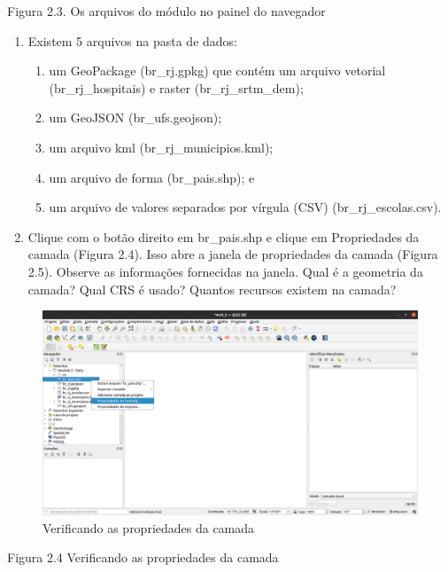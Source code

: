 \documentclass[
  portuguese,
]{krantz}
\providecommand{\tightlist}{%
  \setlength{\itemsep}{0pt}\setlength{\parskip}{0pt}}
\begin{document}
Figura 2.3. Os arquivos do módulo no painel do navegador

\begin{enumerate}
\def\labelenumi{\arabic{enumi}.}
\setcounter{enumi}{5}
\item
  Existem 5 arquivos na pasta de dados:

  \begin{enumerate}
  \def\labelenumii{\arabic{enumii}.}
  \tightlist
  \item
    um GeoPackage (br\_rj.gpkg) que contém um arquivo vetorial (br\_rj\_hospitais) e raster (br\_rj\_srtm\_dem);
  \item
    um GeoJSON (br\_ufs.geojson);
  \item
    um arquivo kml (br\_rj\_municipios.kml);
  \item
    um arquivo de forma (br\_pais.shp); e
  \item
    um arquivo de valores separados por vírgula (CSV) (br\_rj\_escolas.csv).
  \end{enumerate}
\item
  Clique com o botão direito em br\_pais.shp e clique em Propriedades da camada (Figura 2.4). Isso abre a janela de propriedades da camada (Figura 2.5). Observe as informações fornecidas na janela. Qual é a geometria da camada? Qual CRS é usado? Quantos recursos existem na camada?
\end{enumerate}

\begin{figure}
\centering
\includegraphics{media/modulo2/qgis-browser-3.png}
\caption{Verificando as propriedades da camada}
\end{figure}

Figura 2.4 Verificando as propriedades da camada
\end{document}
